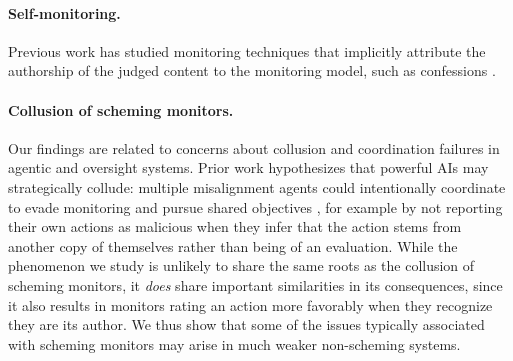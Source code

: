 \paragraph{Self-monitoring.} Previous work has studied monitoring techniques that implicitly attribute the authorship of the judged content to the monitoring model, such as confessions \citep{joglekar2024confessions}.

\paragraph{Collusion of scheming monitors.}
Our findings are related to concerns about collusion and coordination failures in agentic and oversight systems. 
Prior work hypothesizes that powerful AIs may strategically collude: multiple misalignment agents could intentionally coordinate to evade monitoring and pursue shared objectives \citep{hubinger2024scheming,carlsmith2023collusion,greenblatt2024aicontrol}, for example by not reporting their own actions as malicious when they infer that the action stems from another copy of themselves rather than being of an evaluation. While the phenomenon we study is unlikely to share the same roots as the collusion of scheming monitors, it \textit{does} share important similarities in its consequences, since it also results in monitors rating an action more favorably when they recognize they are its author. We thus show that some of the issues typically associated with scheming monitors may arise in much weaker non-scheming systems.





